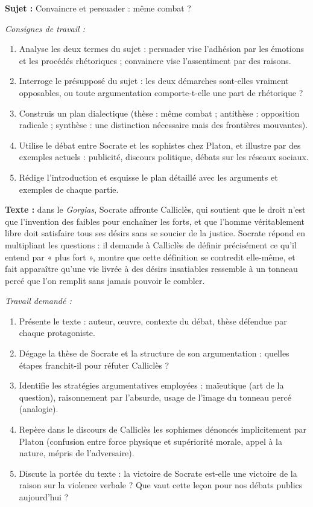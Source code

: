 \documentclass[11pt]{article}
\begin{document}
\begin{exercice}
\textbf{Sujet :} Convaincre et persuader : même combat ?

\emph{Consignes de travail :}
\begin{enumerate}
\item Analyse les deux termes du sujet : persuader vise l'adhésion par les émotions et les procédés rhétoriques ; convaincre vise l'assentiment par des raisons.
\item Interroge le présupposé du sujet : les deux démarches sont-elles vraiment opposables, ou toute argumentation comporte-t-elle une part de rhétorique ?
\item Construis un plan dialectique (thèse : même combat ; antithèse : opposition radicale ; synthèse : une distinction nécessaire mais des frontières mouvantes).
\item Utilise le débat entre Socrate et les sophistes chez Platon, et illustre par des exemples actuels : publicité, discours politique, débats sur les réseaux sociaux.
\item Rédige l'introduction et esquisse le plan détaillé avec les arguments et exemples de chaque partie.
\end{enumerate}
\end{exercice}

\begin{exercice}
\textbf{Texte :} dans le \emph{Gorgias}, Socrate affronte Calliclès, qui soutient que le droit n'est que l'invention des faibles pour enchaîner les forts, et que l'homme véritablement libre doit satisfaire tous ses désirs sans se soucier de la justice. Socrate répond en multipliant les questions : il demande à Calliclès de définir précisément ce qu'il entend par « plus fort », montre que cette définition se contredit elle-même, et fait apparaître qu'une vie livrée à des désirs insatiables ressemble à un tonneau percé que l'on remplit sans jamais pouvoir le combler.

\emph{Travail demandé :}
\begin{enumerate}
\item Présente le texte : auteur, œuvre, contexte du débat, thèse défendue par chaque protagoniste.
\item Dégage la thèse de Socrate et la structure de son argumentation : quelles étapes franchit-il pour réfuter Calliclès ?
\item Identifie les stratégies argumentatives employées : maïeutique (art de la question), raisonnement par l'absurde, usage de l'image du tonneau percé (analogie).
\item Repère dans le discours de Calliclès les sophismes dénoncés implicitement par Platon (confusion entre force physique et supériorité morale, appel à la nature, mépris de l'adversaire).
\item Discute la portée du texte : la victoire de Socrate est-elle une victoire de la raison sur la violence verbale ? Que vaut cette leçon pour nos débats publics aujourd'hui ?
\end{enumerate}
\end{exercice}
\end{document}
